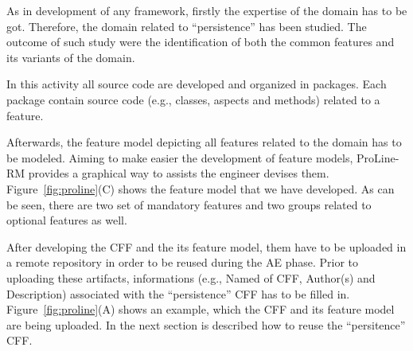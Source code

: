 As in development of any framework, firstly the expertise of the domain has to be got.
Therefore, the domain related to ``persistence'' has been studied. 
The outcome of such study were the identification of both the common features and its variants of the domain. 

In this activity all source code are developed and organized in packages. Each package contain source code (e.g., classes, aspects and methods) related to a feature. %

Afterwards, the feature model depicting all features related to the domain has to be modeled. 
Aiming to make easier the development of feature models, ProLine-RM provides a graphical way to assists the engineer devises them. 
Figure~\ref{fig:proline}(C) shows the feature model that we have developed. 
As can be seen, there are two set of mandatory features and two groups related to optional features as well.  

After developing the CFF and the its feature model, them have to be uploaded in a remote repository in order to be reused during the AE phase.
Prior to uploading these artifacts, informations (e.g., Named of CFF, Author(s) and Description) associated with the ``persistence'' CFF has to be filled in. Figure~\ref{fig:proline}(A) shows an example, which the CFF and its feature model are being uploaded. In the next section is described how to reuse the ``persitence'' CFF.